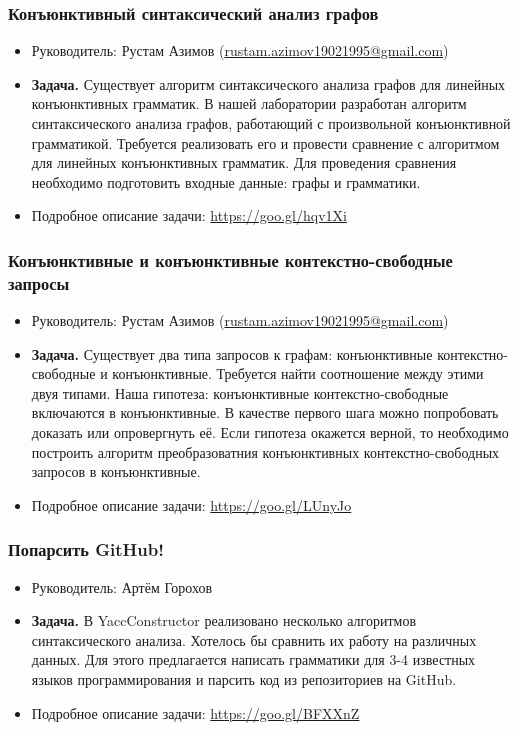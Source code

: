 \documentclass{beamer}
\begin{document}
\begin{frame}
  \transwipe[direction=90]
  \frametitle{Конъюнктивный синтаксический анализ графов}
  \begin{itemize}
    \item Руководитель: Рустам Азимов (\url{rustam.azimov19021995@gmail.com})
    \item \textbf{Задача.} 
    Существует алгоритм синтаксического анализа графов для линейных конъюнктивных грамматик. 
    В нашей лаборатории разработан алгоритм синтаксического анализа графов, работающий с произвольной конъюнктивной грамматикой.
    Требуется реализовать его и провести сравнение с алгоритмом для линейных конъюнктивных грамматик. 
    Для проведения сравнения необходимо подготовить входные данные: графы и грамматики.
    \item Подробное описание задачи: \url{https://goo.gl/hqv1Xi}
  \end{itemize}
\end{frame}

\begin{frame}
  \transwipe[direction=90]
  \frametitle{Конъюнктивные и конъюнктивные контекстно-свободные запросы}
  \begin{itemize}
    \item Руководитель: Рустам Азимов (\url{rustam.azimov19021995@gmail.com})
    \item \textbf{Задача.} 
    Существует два типа запросов к графам: конъюнктивные контекстно-свободные и конъюнктивные. 
    Требуется найти соотношение между этими двуя типами.
    Наша гипотеза: конъюнктивные контекстно-свободные включаются в конъюнктивные.
    В качестве первого шага можно попробовать доказать или опровергнуть её. 
    Если гипотеза окажется верной, то необходимо построить алгоритм преобразоватния конъюнктивных контекстно-свободных запросов в конъюнктивные.
    \item Подробное описание задачи: \url{https://goo.gl/LUnyJo}
  \end{itemize}
\end{frame}


\begin{frame}
  \transwipe[direction=90]
  \frametitle{Попарсить GitHub!}
  \begin{itemize}
    \item Руководитель: Артём Горохов
    \item \textbf{Задача.}
    В YaccConstructor реализовано несколько алгоритмов синтаксического анализа. Хотелось бы сравнить их работу на различных данных. Для этого предлагается написать грамматики для 3-4 известных языков программирования и парсить код из репозиториев на GitHub.
    \item Подробное описание задачи: \url{https://goo.gl/BFXXnZ}
  \end{itemize}

\end{frame}
\end{document}
